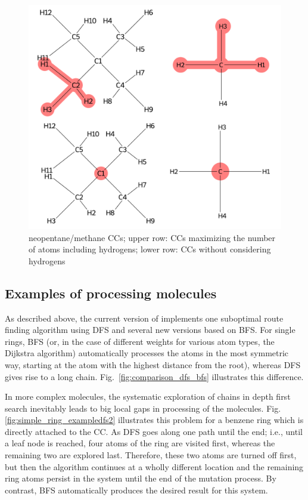 \begin{figure}
	\includegraphics[scale=0.55]{neopentan_new}
	
	\caption{neopentane/methane CCs; upper row: CCs maximizing the number of atoms including hydrogens; lower row: CCs without considering hydrogens }
		\label{fig:neopentan}
\end{figure}



\subsection{Examples of processing molecules}

As described above, the current version of {\trafo} implements one suboptimal route finding algorithm using DFS and several new versions based on BFS.
For single rings, BFS (or, in the case of different weights for various atom types, the Dijkstra algorithm) automatically processes the atoms in the most symmetric way, starting at the atom with the highest distance from the root), whereas DFS gives rise to a long chain. Fig.~\ref{fig:comparison_dfs_bfs} illustrates this difference.

In more complex molecules, the systematic exploration of chains in
depth first search inevitably leads to big local gaps in processing
of the molecules. Fig. \ref{fig:simple_ring_exampledfs2} illustrates this problem for a benzene ring which
is directly attached to the CC. As DFS goes along one path
until the end; i.e., until a leaf node is reached, four atoms of the
ring are visited first, whereas the remaining two are explored
last. Therefore, these two atoms are turned off first, but then the
algorithm continues at a wholly different location and the remaining
ring atoms persist in the system until the end of the mutation process.
By contrast, BFS automatically produces the desired result for this system. 


